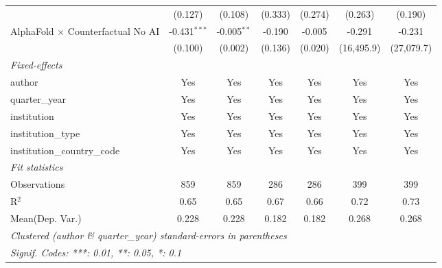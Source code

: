 \begin{tabular}{lcccccc}
                                            & (0.127)        & (0.108)       & (0.333)     & (0.274) & (0.263)    & (0.190)\\   
   AlphaFold $\times$ Counterfactual No AI  & -0.431$^{***}$ & -0.005$^{**}$ & -0.190      & -0.005  & -0.291     & -0.231\\   
                                            & (0.100)        & (0.002)       & (0.136)     & (0.020) & (16,495.9) & (27,079.7)\\   
   \midrule
   \emph{Fixed-effects}\\
   author                                   & Yes            & Yes           & Yes         & Yes     & Yes        & Yes\\  
   quarter\_year                            & Yes            & Yes           & Yes         & Yes     & Yes        & Yes\\  
   institution                              & Yes            & Yes           & Yes         & Yes     & Yes        & Yes\\  
   institution\_type                        & Yes            & Yes           & Yes         & Yes     & Yes        & Yes\\  
   institution\_country\_code               & Yes            & Yes           & Yes         & Yes     & Yes        & Yes\\  
   \midrule
   \emph{Fit statistics}\\
   Observations                             & 859            & 859           & 286         & 286     & 399        & 399\\  
   R$^2$                                    & 0.65           & 0.65          & 0.67        & 0.66    & 0.72       & 0.73\\  
Mean(Dep. Var.) & 0.228 & 0.228 & 0.182 & 0.182 & 0.268 & 0.268 \\
   \midrule \midrule
   \multicolumn{7}{l}{\emph{Clustered (author \& quarter\_year) standard-errors in parentheses}}\\
   \multicolumn{7}{l}{\emph{Signif. Codes: ***: 0.01, **: 0.05, *: 0.1}}\\
\end{tabular}
\par\endgroup
